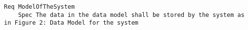

\begin{lstlisting}
Req ModelOfTheSystem
	Spec The data in the data model shall be stored by the system as in Figure 2: Data Model for the system

\end{lstlisting}